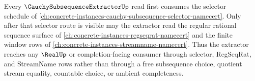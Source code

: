 Every $\CauchySubsequenceExtractorUp$ read first consumes the selector schedule of \autoref{ch:concrete-instances-cauchy-subsequence-selector-namecert}. Only after that selector route is visible may the extractor read the regular rational sequence surface of \autoref{ch:concrete-instances-regseqrat-namecert} and the finite window rows of \autoref{ch:concrete-instances-streamname-namecert}. Thus the extractor reaches any $\RealUp$ or completion-facing consumer through selector, RegSeqRat, and StreamName rows rather than through a free subsequence choice, quotient stream equality, countable choice, or ambient completeness.

